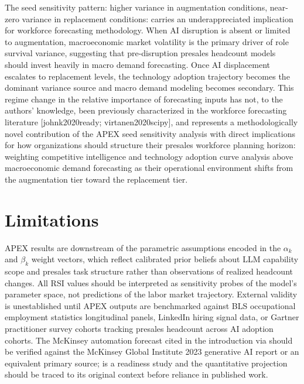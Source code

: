 \documentclass[10pt, conference]{IEEEtran}
\begin{document}
The seed sensitivity pattern: higher variance in augmentation conditions, near-zero variance in replacement conditions: carries an underappreciated implication for workforce forecasting methodology. When AI disruption is absent or limited to augmentation, macroeconomic market volatility is the primary driver of role survival variance, suggesting that pre-disruption presales headcount models should invest heavily in macro demand forecasting. Once AI displacement escalates to replacement levels, the technology adoption trajectory becomes the dominant variance source and macro demand modeling becomes secondary. This regime change in the relative importance of forecasting inputs has not, to the authors' knowledge, been previously characterized in the workforce forecasting literature [johnk2020ready; virtanen2020scipy], and represents a methodologically novel contribution of the APEX seed sensitivity analysis with direct implications for how organizations should structure their presales workforce planning horizon: weighting competitive intelligence and technology adoption curve analysis above macroeconomic demand forecasting as their operational environment shifts from the augmentation tier toward the replacement tier.

\section{Limitations}

\label{sec:limitations}

APEX results are downstream of the parametric assumptions encoded in the $\alpha_k$ and $\beta_k$ weight vectors, which reflect calibrated prior beliefs about LLM capability scope and presales task structure rather than observations of realized headcount changes. All RSI values should be interpreted as sensitivity probes of the model's parameter space, not predictions of the labor market trajectory. External validity is unestablished until APEX outputs are benchmarked against BLS occupational employment statistics longitudinal panels, LinkedIn hiring signal data, or Gartner practitioner survey cohorts tracking presales headcount across AI adoption cohorts. The McKinsey automation forecast cited in the introduction via \cite{johnk2020ready} should be verified against the McKinsey Global Institute 2023 generative AI report or an equivalent primary source; \cite{johnk2020ready} is a readiness study and the quantitative projection should be traced to its original context before reliance in published work.
\end{document}
